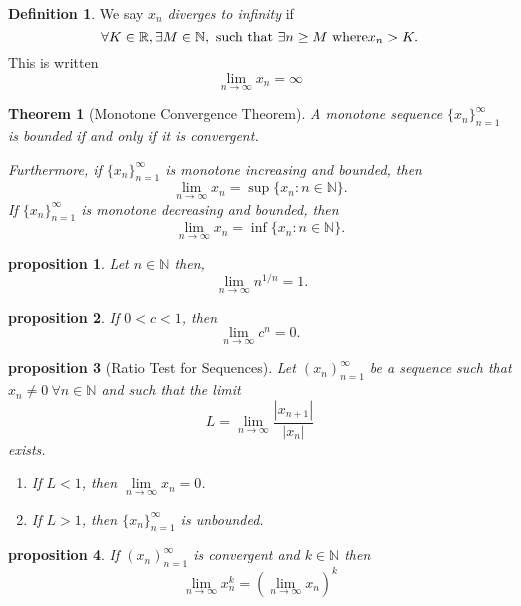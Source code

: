 \documentclass{article}
\newtheorem{theorem}{Theorem}[section]
\newtheorem{proposition}{Proposition}[section]
\newtheorem{proposition}{proposition}[section]
\theoremstyle{definition}
\newtheorem{definition}{Definition}[section]
\theoremstyle{remark}
\begin{document}
\begin{definition}\label{def:divergent sequence}
We say \(x_n\) \textit{diverges to infinity} if
\[
\forall K \in \mathbb{R}, \exists M \in \mathbb{N}, \textnormal{ such that } \exists n \geq  M \textnormal{ where} x_n > K.
\]
This is written
\[
\lim_{n \to \infty}{x_n} = \infty
\]
\end{definition}



\begin{theorem}[Monotone Convergence Theorem] \label{thm: monotone convergence theorem}
A monotone sequence \(\{x_n\}_{n=1}^{\infty}\) is bounded if and only if it is convergent.

\textit{Furthermore, if} \(\{x_n\}_{n=1}^{\infty}\) \textit{is monotone increasing and bounded, then}
\[
\lim_{n \to \infty} x_n = \sup \{x_n : n \in \mathbb{N} \}.
\]
\textit{If} \(\{x_n\}_{n=1}^{\infty}\) \textit{is monotone decreasing and bounded, then}
\[
\lim_{n \to \infty} x_n = \inf \{x_n : n \in \mathbb{N} \}.
\]
\end{theorem}





\begin{proposition} \label{ex: nth root limit}
Let \(n \in \mathbb{N}\) then,
\[
\ \lim_{n \to \infty}{n^{1/n}} = 1.
\]
\end{proposition}




\begin{proposition} \label{ex: limit of c^n}
If $0<c<1$, then 
\[
\lim_{n \to \infty} c^n = 0.
\]
\end{proposition}




\begin{proposition}[Ratio Test for Sequences] \label{ex:ratio_test}
Let \( (x_n)_{n=1}^{\infty} \) be a sequence such that \( x_n \neq 0 \ \forall n \in \mathbb{N}\) and such that the limit
\[
L = \lim_{n \to \infty} \frac{|x_{n+1}|}{|x_n|}
\]
exists.
\begin{enumerate}
\item If \( L < 1 \), then \( \lim\limits_{n\to\infty} x_n = 0 \).
\item If \( L > 1 \), then \( \{x_n\}_{n=1}^{\infty} \) is unbounded.
\end{enumerate}
\end{proposition}




\begin{proposition}
If $ (x_n)^\infty_{n=1}$ is convergent and $ k \in \mathbb{N}$ then
\[
\lim_{n \to \infty}{x_n^k} = \left( \lim_{n \to \infty}{x_n}\right)^k
\]
\end{proposition}
\end{document}
